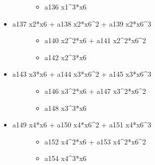 \documentclass[letterpaper,10pt,english]{sphinxmanual}
\begin{document}
\begin{fulllineitems}
\begin{description}
\begin{itemize}
\begin{description}
\begin{itemize}
\item {} 
a136 x1\textasciicircum{}3*x6

\end{itemize}

\end{description}

\item {} \begin{description}
\item[{a137 x2*x6 + a138 x2*x6\textasciicircum{}2 + a139 x2*x6\textasciicircum{}3}] \leavevmode\begin{itemize}
\item {} 
a140 x2\textasciicircum{}2*x6 + a141 x2\textasciicircum{}2*x6\textasciicircum{}2

\item {} 
a142 x2\textasciicircum{}3*x6

\end{itemize}

\end{description}

\item {} \begin{description}
\item[{a143 x3*x6 + a144 x3*x6\textasciicircum{}2 + a145 x3*x6\textasciicircum{}3}] \leavevmode\begin{itemize}
\item {} 
a146 x3\textasciicircum{}2*x6 + a147 x3\textasciicircum{}2*x6\textasciicircum{}2

\item {} 
a148 x3\textasciicircum{}3*x6

\end{itemize}

\end{description}

\item {} \begin{description}
\item[{a149 x4*x6 + a150 x4*x6\textasciicircum{}2 + a151 x4*x6\textasciicircum{}3}] \leavevmode\begin{itemize}
\item {} 
a152 x4\textasciicircum{}2*x6 + a153 x4\textasciicircum{}2*x6\textasciicircum{}2

\item {} 
a154 x4\textasciicircum{}3*x6

\end{itemize}

\end{description}


\end{itemize}
\end{description}
\end{fulllineitems}
\end{document}

